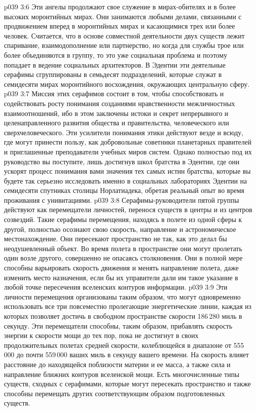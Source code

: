 \vs p039 3:6 Эти ангелы продолжают свое служение в мирах\hyp{}обителях и в более высоких моронтийных мирах. Они занимаются любыми делами, связанными с продвижением вперед в моронтийных мирах и касающимися трех или более человек. Считается, что в основе совместной деятельности двух существ лежит спаривание, взаимодополнение или партнерство, но когда для службы трое или более объединяются в группу, то это уже социальная проблема и поэтому попадает в ведение социальных архитекторов. В Эдентии эти деятельные серафимы сгруппированы в семьдесят подразделений, которые служат в семидесяти мирах моронтийного восхождения, окружающих центральную сферу.
\vs p039 3:7 \bibnobreakspace {} Миссия этих серафимов состоит в том, чтобы способствовать и содействовать росту понимания созданиями нравственности межличностных взаимоотношений, ибо в этом заключены истоки и секрет непрерывного и целенаправленного развития общества и правительства, человеческого или сверхчеловеческого. Эти усилители понимания этики действуют везде и всюду, где могут принести пользу, как добровольные советники планетарных правителей и приглашенные преподаватели учебных миров систем. Однако полностью под их руководство вы поступите, лишь достигнув школ братства в Эдентии, где они ускорят процесс понимания вами значения тех самых истин братства, которые вы будете так серьезно исследовать именно в социальных лабораториях Эдентии на семидесяти спутниках столицы Норлатиадека, обретая реальный опыт во время проживания с унивитациями.
\vs p039 3:8 \bibnobreakspace {} Серафимы\hyp{}руководители пятой группы действуют как перемещатели личностей, перенося существ в центры и из центров созвездий. Такие серафимы перемещения, находясь в полете из одной сферы к другой, полностью осознают свою скорость, направление и астрономическое местонахождение. Они пересекают пространство не так, как это делал бы неодушевленный объект. Во время полета в пространстве они могут пролетать один возле другого, совершенно не опасаясь столкновения. Они в полной мере способны варьировать скорость движения и менять направление полета, даже изменить место назначения, если бы их управители дали им такое указание в любой точке пересечения вселенских контуров информации.
\vs p039 3:9 Эти личности перемещения организованы таким образом, что могут одновременно использовать все три повсеместно пролегающие энергетические линии, каждая из которых позволяет достичь в свободном пространстве скорости 186\,280 миль в секунду. Эти перемещатели способны, таким образом, прибавлять скорость энергии к скорости мощи до тех пор, пока не достигнут в своих продолжительных полетах средней скорости, колеблющейся в диапазоне от 555\,000 до почти 559\,000 ваших миль в секунду вашего времени. На скорость влияет расстояние до находящейся поблизости материи и ее масса, а также сила и направление ближних контуров вселенской мощи. Есть многочисленные типы существ, сходных с серафимами, которые могут пересекать пространство и также способны перемещать других соответствующим образом подготовленных существ.
